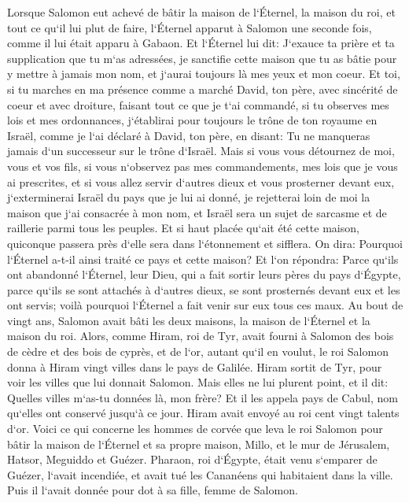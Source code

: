 \verse Lorsque Salomon eut achevé de bâtir la maison de l`Éternel, la maison du roi, et tout ce qu`il lui plut de faire, 
\verse l`Éternel apparut à Salomon une seconde fois, comme il lui était apparu à Gabaon. 
\verse Et l`Éternel lui dit: J`exauce ta prière et ta supplication que tu m`as adressées, je sanctifie cette maison que tu as bâtie pour y mettre à jamais mon nom, et j`aurai toujours là mes yeux et mon coeur. 
\verse Et toi, si tu marches en ma présence comme a marché David, ton père, avec sincérité de coeur et avec droiture, faisant tout ce que je t`ai commandé, si tu observes mes lois et mes ordonnances, 
\verse j`établirai pour toujours le trône de ton royaume en Israël, comme je l`ai déclaré à David, ton père, en disant: Tu ne manqueras jamais d`un successeur sur le trône d`Israël. 
\verse Mais si vous vous détournez de moi, vous et vos fils, si vous n`observez pas mes commandements, mes lois que je vous ai prescrites, et si vous allez servir d`autres dieux et vous prosterner devant eux, 
\verse j`exterminerai Israël du pays que je lui ai donné, je rejetterai loin de moi la maison que j`ai consacrée à mon nom, et Israël sera un sujet de sarcasme et de raillerie parmi tous les peuples. 
\verse Et si haut placée qu`ait été cette maison, quiconque passera près d`elle sera dans l`étonnement et sifflera. On dira: Pourquoi l`Éternel a-t-il ainsi traité ce pays et cette maison? 
\verse Et l`on répondra: Parce qu`ils ont abandonné l`Éternel, leur Dieu, qui a fait sortir leurs pères du pays d`Égypte, parce qu`ils se sont attachés à d`autres dieux, se sont prosternés devant eux et les ont servis; voilà pourquoi l`Éternel a fait venir sur eux tous ces maux. 
\verse Au bout de vingt ans, Salomon avait bâti les deux maisons, la maison de l`Éternel et la maison du roi. 
\verse Alors, comme Hiram, roi de Tyr, avait fourni à Salomon des bois de cèdre et des bois de cyprès, et de l`or, autant qu`il en voulut, le roi Salomon donna à Hiram vingt villes dans le pays de Galilée. 
\verse Hiram sortit de Tyr, pour voir les villes que lui donnait Salomon. Mais elles ne lui plurent point, 
\verse et il dit: Quelles villes m`as-tu données là, mon frère? Et il les appela pays de Cabul, nom qu`elles ont conservé jusqu`à ce jour. 
\verse Hiram avait envoyé au roi cent vingt talents d`or. 
\verse Voici ce qui concerne les hommes de corvée que leva le roi Salomon pour bâtir la maison de l`Éternel et sa propre maison, Millo, et le mur de Jérusalem, Hatsor, Meguiddo et Guézer. 
\verse Pharaon, roi d`Égypte, était venu s`emparer de Guézer, l`avait incendiée, et avait tué les Cananéens qui habitaient dans la ville. Puis il l`avait donnée pour dot à sa fille, femme de Salomon. 
